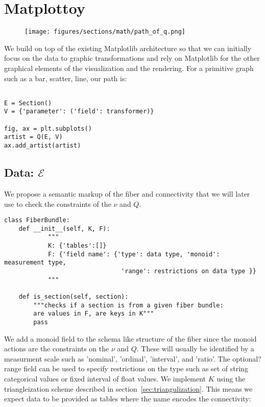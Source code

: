 \documentclass[../main.tex]{subfiles}
\begin{document}
\section{Matplottoy}
\begin{figure}
\texttt{[image: figures/sections/math/path\_of\_q.png]}
\end{figure}

We build on top of the existing Matplotlib architecture \cite{hunterMatplotlib2DGraphics2007} so that we can initially focus on the data to graphic transformations and rely on Matplotlib for the other graphical elements of the visualization and the rendering. For a primitive graph such as a bar, scatter, line, our path is: 
\begin{verbatim}

E = Section()
V = {'parameter': ('field': transformer)}

fig, ax = plt.subplots()
artist = Q(E, V)
ax.add_artist(artist)
\end{verbatim}



\subsection{Data: $\mathcal{E}$}
We propose a semantic markup of the fiber and connectivity that we will later use to check the constraints of the $\nu$ and $Q$. 
\begin{verbatim}
class FiberBundle:
    def __init__(self, K, F):
            """
            K: {'tables':[]}
            F: {'field name': {'type': data type, 'monoid': measurement type, 
                                'range': restrictions on data type }}
            """

    def is_section(self, section):
        """checks if a section is from a given fiber bundle:
        are values in F, are keys in K"""
        pass
\end{verbatim}
We add a monoid field to the schema like structure of the fiber since the monoid actions are the constraints on the $\nu$ and $Q$. These will usually be identified by a measurment scale such as 'nominal', 'ordinal', 'interval', and 'ratio'. The optional? range field can be used to specify restrictions on the type such as set of string categorical values or fixed interval of float values.  We implement $K$ using the triangleization scheme described in section~\ref{sec:triangulization}. This means we expect data to be provided as tables where the name encodes the connectivity:
\end{document}

